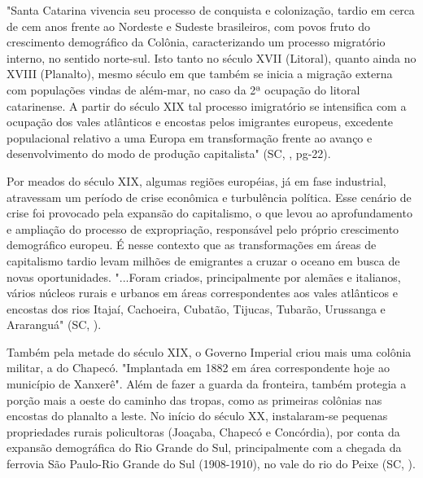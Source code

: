 \begin{citacao}
"Santa Catarina vivencia seu processo de conquista e colonização, tardio em cerca
de cem anos frente ao Nordeste e Sudeste brasileiros, com povos fruto do crescimento demográfico da Colônia, caracterizando um processo migratório interno, no sentido norte-sul. Isto tanto no século XVII (Litoral), quanto ainda no XVIII (Planalto), mesmo século em que também se inicia a migração externa com populações vindas de além-mar, no caso da 2ª ocupação do litoral catarinense. A partir do século XIX tal processo imigratório se intensifica com a ocupação dos vales atlânticos e encostas pelos imigrantes europeus, excedente populacional  relativo a uma Europa em transformação frente ao avanço e desenvolvimento do modo de produção capitalista" (\acrlong{SC}, \citeyear{AtlasSCpopulacao}, pg-22). 
\end{citacao}

\indent Por meados do século XIX, algumas regiões européias, já em fase industrial, atravessam um período de crise econômica e turbulência política. Esse cenário de crise foi provocado pela expansão do capitalismo, o que levou ao aprofundamento e ampliação do processo de expropriação, responsável pelo próprio crescimento demográfico europeu. É nesse contexto que as transformações em áreas de capitalismo
tardio levam milhões de emigrantes a cruzar o oceano em busca de novas oportunidades. "...Foram criados, principalmente por alemães e italianos, vários núcleos rurais e urbanos em áreas correspondentes aos vales atlânticos e encostas dos rios Itajaí, Cachoeira, Cubatão, Tijucas, Tubarão, Urussanga e Araranguá" (\acrlong{SC}, \citeyear{AtlasSCpopulacao}).

\indent Também pela metade do século XIX, o Governo Imperial criou mais uma colônia militar, a do Chapecó. "Implantada em 1882 em área correspondente hoje ao município de Xanxerê". Além de fazer a guarda da fronteira, também protegia a porção mais a oeste do caminho das tropas, como as primeiras colônias nas encostas do planalto a leste. No início do século XX, instalaram-se pequenas propriedades rurais policultoras (Joaçaba, Chapecó e Concórdia), por conta da expansão demográfica do Rio Grande do Sul, principalmente com a chegada da ferrovia São Paulo-Rio Grande do Sul (1908-1910), no vale do rio do Peixe (\acrlong{SC}, \citeyear{AtlasSCpopulacao}).

